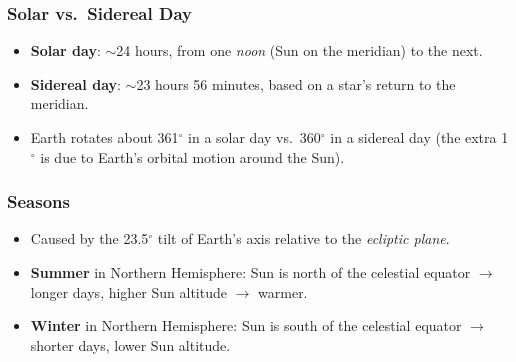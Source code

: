 \subsubsection{Solar vs.\ Sidereal Day}
\begin{itemize}
  \item \textbf{Solar day}: $\sim$24 hours, from one \emph{noon} (Sun on the meridian) to the next.
  \item \textbf{Sidereal day}: $\sim$23 hours 56 minutes, based on a star’s return to the meridian.
  \item Earth rotates about 361$^\circ$ in a solar day vs.\ 360$^\circ$ in a sidereal day (the extra 1$^\circ$ is due to Earth’s orbital motion around the Sun).
\end{itemize}

\subsubsection{Seasons}
\begin{itemize}
  \item Caused by the 23.5$^\circ$ tilt of Earth’s axis relative to the \emph{ecliptic plane}.
  \item \textbf{Summer} in Northern Hemisphere: Sun is north of the celestial equator $\rightarrow$ longer days, higher Sun altitude $\rightarrow$ warmer.
  \item \textbf{Winter} in Northern Hemisphere: Sun is south of the celestial equator $\rightarrow$ shorter days, lower Sun altitude.
\end{itemize}

